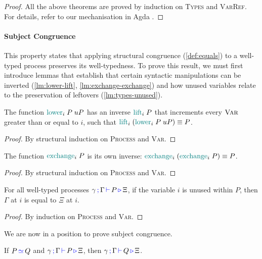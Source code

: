 \begin{proof}[Proof]
  All the above theorems are proved by induction on \textsc{Types} and \textsc{VarRef}.
  For details, refer to our mechanisation in Agda \cite{Zalakain2020Agda}.
\end{proof}

\paragraph*{Subject Congruence}
This property states that applying structural congruence (\autoref{def:equals}) to a well-typed process preserves its well-typedness.
To prove this result, we must first introduce lemmas that establish that certain syntactic manipulations can be inverted (\autoref{lm:lower-lift}, \autoref{lm:exchange-exchange}) and how unused variables relate to the preservation of leftovers (\autoref{lm:types-unused}).

\begin{nilemma}
  \label{lm:lower-lift}
  The function $\textcolor{teal}{\operatorname{lower}}_i \; P \; uP$ has an inverse $\textcolor{teal}{\operatorname{lift}}_i \; P$ that increments every $\textsc{Var}$ greater than or equal to $i$, such that $\textcolor{teal}{\operatorname{lift}}_i \; (\textcolor{teal}{\operatorname{lower}}_i \; P \; uP) \equiv P$.
\end{nilemma}
\begin{proof}
  By structural induction on \textsc{Process} and \textsc{Var}.
\end{proof}

\begin{nilemma}
  \label{lm:exchange-exchange}
  The function $\textcolor{teal}{\operatorname{exchange}}_i \; P$ is its own inverse: $\textcolor{teal}{\operatorname{exchange}}_i \; (\textcolor{teal}{\operatorname{exchange}}_i \; P) \equiv P$.
\end{nilemma}
\begin{proof}
  By structural induction on \textsc{Process} and \textsc{Var}.
\end{proof}

\begin{nilemma}
  \label{lm:types-unused}
  For all well-typed processes $\gamma \, \textcolor{blue}{\operatorname{;}} \, \Gamma \, \textcolor{blue}{\operatorname{\vdash}} \, P \, \textcolor{blue}{\operatorname{\triangleright}} \, \Xi$, if the variable $i$ is unused within $P$, then $\Gamma$ at $i$ is equal to $\Xi$ at $i$.
\end{nilemma}
\begin{proof}
  By induction on \textsc{Process} and \textsc{Var}.
\end{proof}

We are now in a position to prove subject congruence.

\begin{nitheorem}
  \label{thm:subject-congruence1}
  If $P \, \textcolor{blue}{\operatorname{\simeq}} \,{} Q$ and $\gamma \, \textcolor{blue}{\operatorname{;}} \, \Gamma \, \textcolor{blue}{\operatorname{\vdash}} \, P \, \textcolor{blue}{\operatorname{\triangleright}} \, \Xi$, then $\gamma \, \textcolor{blue}{\operatorname{;}} \, \Gamma \, \textcolor{blue}{\operatorname{\vdash}} \, Q \, \textcolor{blue}{\operatorname{\triangleright}} \, \Xi$.
\end{nitheorem}

